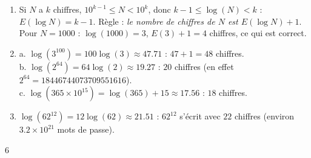 {\begin{enumerate}
\begin{enumerate}[label=\alph*.]
\item $E(\log N)=14$, et $14+1=15$ chiffres.
\end{enumerate}
\item Si $N$ a $k$ chiffres, $10^{k-1}\leqslant N<10^k$, donc $k-1\leqslant\log(N)<k$ : $E(\log N)=k-1$. Règle : \emph{le nombre de chiffres de $N$ est $E(\log N)+1$}. Pour $N=\num{1000}$ : $\log(\num{1000})=3$, $E(3)+1=4$ chiffres, ce qui est correct.
\item a. $\log(3^{100})=100\log(3)\approx\num{47,71}$ : $47+1=48$ chiffres.\\
b. $\log(2^{64})=64\log(2)\approx\num{19,27}$ : $20$ chiffres (en effet $2^{64}=\num{18446744073709551616}$).\\
c. $\log(365\times10^{15})=\log(365)+15\approx\num{17,56}$ : $18$ chiffres.
\item $\log(62^{12})=12\log(62)\approx\num{21,51}$ : $62^{12}$ s'écrit avec $22$ chiffres (environ $\num{3,2}\times10^{21}$ mots de passe).
\end{enumerate}
}{6}

